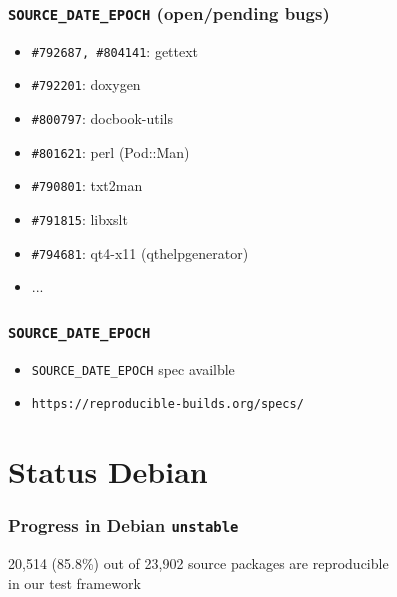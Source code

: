 \documentclass[14pt]{beamer}
\begin{document}
\begin{frame}
 \frametitle{\texttt{SOURCE\_DATE\_EPOCH} (open/pending bugs)}

 \begin{itemize}
  \item \texttt{\#792687, \#804141}: gettext
  \item \texttt{\#792201}: doxygen
  \item \texttt{\#800797}: docbook-utils
  \item \texttt{\#801621}: perl (Pod::Man)
  \item \texttt{\#790801}: txt2man
  \item \texttt{\#791815}: libxslt
  \item \texttt{\#794681}: qt4-x11 (qthelpgenerator)
  \item ...
 \end{itemize}

\end{frame}

\begin{frame}
 \frametitle{\texttt{SOURCE\_DATE\_EPOCH}}

 \begin{itemize}
  \item \texttt{SOURCE\_DATE\_EPOCH} spec availble
  \item \texttt{https://reproducible-builds.org/specs/}
 \end{itemize}
\end{frame}


\section{Status Debian}

\begin{frame}
 \frametitle{Progress in Debian \texttt{unstable}}
 \begin{center}
  \footnotesize{20,514 (85.8\%) out of 23,902 source packages are reproducible \\
    in our test framework}
  \vfill
 \end{center}
\end{frame}
\end{document}
